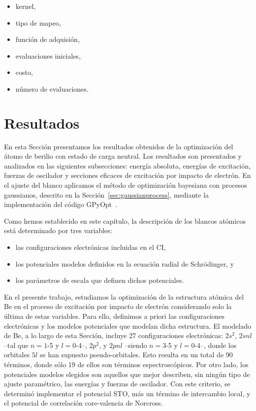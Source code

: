 \begin{itemize}
\item kernel, 
\item tipo de mapeo, 
\item función de adquisión, 
\item evaluaciones iniciales,
\item costo, 
\item número de evaluaciones.
\end{itemize}


\newpage
\section{Resultados}

En esta Sección presentamos los resultados obtenidos de la optimización
del átomo de berilio con estado de carga neutral. Los resultados son 
presentados y analizados en las siguientes subsecciones: energía 
absoluta, energías de excitación, fuerzas de oscilador y secciones 
eficaces de excitación por impacto de electrón. En el ajuste del blanco 
aplicamos el método de optimización bayesiana con procesos gaussianos, 
descrito en la Sección~\ref{sec:gaussianprocess}, mediante la 
implementación del código GPyOpt~\cite{GPyOpt}.

Como hemos establecido en este capítulo, la descripción de los blancos 
atómicos está determinado por tres variables:
\begin{itemize}
\item las configuraciones electrónicas incluidas en el CI,
\item los potenciales modelos definidos en la ecuación radial de 
Schr\"odinger, y
\item los parámetros de escala que definen dichos potenciales.
\end{itemize}
En el presente trabajo, estudiamos la optimización de la estructura 
atómica del Be en el proceso de excitación por impacto de electrón 
considerando solo la última de estas variables. Para ello, definimos a 
priori las configuraciones electrónicas y los modelos potenciales que
modelan dicha estructura. El modelado de Be, a lo largo de esta Sección,
incluye 27 configuraciones electrónicas: $2s^2$, $2snl$ --tal que 
$n=1$-5 y $l=0$-4--, $2p^2$, y $2pnl$ --siendo $n=3$-5 y $l=0$-4--, 
donde los orbitales $5l$ se han supuesto pseudo-orbitales. Esto resulta 
en un total de 90 términos, donde sólo 19 de ellos son términos 
espectroscópicos. Por otro lado, los potenciales modelos elegidos son 
aquellos que mejor describen, sin ningún tipo de ajuste paramétrico, las 
energías y fuerzas de oscilador. Con este criterio, se determinó 
implementar el potencial STO, más un término de intercambio local, y el 
potencial de correlación core-valencia de Norcross.

